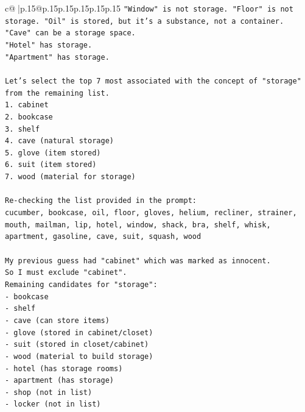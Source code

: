 \documentclass{article}
\begin{document}
{\begin{supertabular}{c@{$\;$}|p{.15\linewidth}@{}p{.15\linewidth}p{.15\linewidth}p{.15\linewidth}p{.15\linewidth}p{.15\linewidth}}
{{{\texttt{"Window" is not storage. "Floor" is not storage. "Oil" is stored, but it's a substance, not a container.} \\
\texttt{"Cave" can be a storage space.} \\
\texttt{"Hotel" has storage.} \\
\texttt{"Apartment" has storage.} \\
\\ 
\texttt{Let's select the top 7 most associated with the concept of "storage" from the remaining list.} \\
\texttt{1. cabinet} \\
\texttt{2. bookcase} \\
\texttt{3. shelf} \\
\texttt{4. cave (natural storage)} \\
\texttt{5. glove (item stored)} \\
\texttt{6. suit (item stored)} \\
\texttt{7. wood (material for storage)} \\
\\ 
\texttt{Re{-}checking the list provided in the prompt:} \\
\texttt{cucumber, bookcase, oil, floor, gloves, helium, recliner, strainer, mouth, mailman, lip, hotel, window, shack, bra, shelf, whisk, apartment, gasoline, cave, suit, squash, wood} \\
\\ 
\texttt{My previous guess had "cabinet" which was marked as innocent.} \\
\texttt{So I must exclude "cabinet".} \\
\texttt{Remaining candidates for "storage":} \\
\texttt{{-} bookcase} \\
\texttt{{-} shelf} \\
\texttt{{-} cave (can store items)} \\
\texttt{{-} glove (stored in cabinet/closet)} \\
\texttt{{-} suit (stored in closet/cabinet)} \\
\texttt{{-} wood (material to build storage)} \\
\texttt{{-} hotel (has storage rooms)} \\
\texttt{{-} apartment (has storage)} \\
\texttt{{-} shop (not in list)} \\
\texttt{{-} locker (not in list)} \\
\\ 
}}}
\end{supertabular}}
\end{document}
